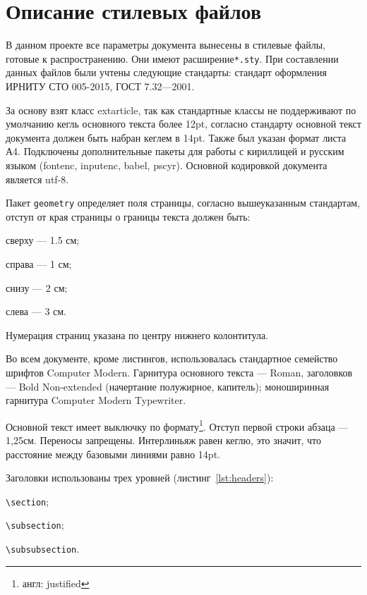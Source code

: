 \section{Описание стилевых файлов}
\label{sec:style}

В данном проекте все параметры документа вынесены в стилевые файлы, готовые к распространению\cite{packages}. Они имеют расширение\texttt{*.sty}. При составлении данных файлов были учтены следующие стандарты: стандарт оформления ИРНИТУ СТО 005-2015\cite{sto005}, ГОСТ 7.32---2001\cite{GOST732}.

За основу взят класс extarticle\cite{Lvovskiy2003}, так как стандартные классы не поддерживают по умолчанию кегль основного текста более 12pt, согласно стандарту основной текст документа должен быть набран кеглем в 14pt. Также был указан формат листа А4. Подключены дополнительные пакеты для работы с кириллицей и русским языком (fontenc, inputenc, babel, pscyr). Основной кодировкой документа является utf-8.

Пакет \texttt{geometry} определяет поля страницы, согласно вышеуказанным стандартам, отступ от края страницы о границы текста должен быть:
\begin{itemize*}
	\item сверху --- 1.5 см;
	\item справа --- 1 см;
	\item снизу --- 2 см;
	\item слева --- 3 см.
\end{itemize*}

Нумерация страниц указана по центру нижнего колонтитула.

Во всем документе, кроме листингов, использовалась стандартное семейство шрифтов Computer Modern. Гарнитура основного текста --- Roman, заголовков --- Bold Non-extended (начертание полужирное, капитель); моноширинная гарнитура Computer Modern Typewriter.

Основной текст имеет выключку по формату\footnote{англ: justified}. Отступ первой строки абзаца --- 1,25см. Переносы запрещены. Интерлиньяж равен кеглю, это значит, что расстояние между базовыми линиями равно 14pt.

Заголовки использованы трех уровней (листинг~\ref{lst:headers}):

\begin{enumerate*}
	\item \texttt{\textbackslash section};
	\item \texttt{\textbackslash subsection};
	\item \texttt{\textbackslash subsubsection}.
\end{enumerate*}

